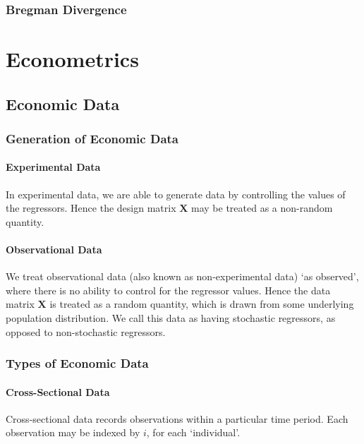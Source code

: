 \documentclass[11pt]{report} %
\begin{document}
\subsection{Bregman Divergence}

\chapter{Econometrics}

\section{Economic Data}

\subsection{Generation of Economic Data}

\subsubsection{Experimental Data}

In experimental data, we are able to generate data by controlling the values of the regressors. Hence the design matrix $\mathbf{X}$ may be treated as a non-random quantity.

\subsubsection{Observational Data}

We treat observational data (also known as non-experimental data) `as observed', where there is no ability to control for the regressor values. Hence the data matrix $\mathbf{X}$ is treated as a random quantity, which is drawn from some underlying population distribution. We call this data as having stochastic regressors, as opposed to non-stochastic regressors.

\subsection{Types of Economic Data}

\subsubsection{Cross-Sectional Data}

Cross-sectional data records observations within a particular time period. Each observation may be indexed by $i$, for each `individual'.
\end{document}
